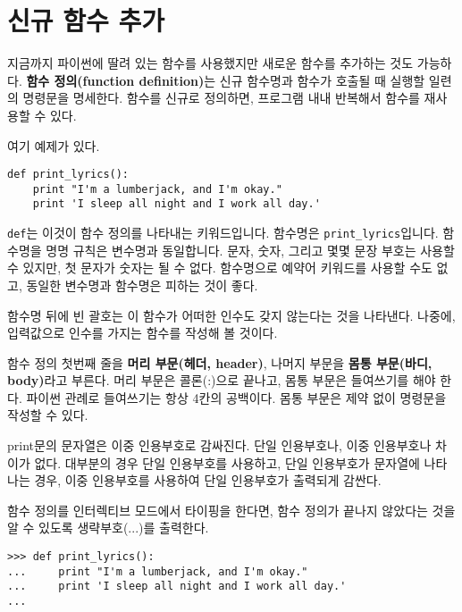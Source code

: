 \section{신규 함수 추가}

지금까지 파이썬에 딸려 있는 함수를 사용했지만 새로운 함수를 추가하는 것도 가능하다.
{\bf 함수 정의(function definition)}는 신규 함수명과 함수가 호출될 때 실행할 일련의 명령문을 명세한다.
함수를 신규로 정의하면, 프로그램 내내 반복해서 함수를 재사용할 수 있다. 


여기 예제가 있다.

\beforeverb
\begin{verbatim}
def print_lyrics():
    print "I'm a lumberjack, and I'm okay."
    print 'I sleep all night and I work all day.'
\end{verbatim}
\afterverb
%
{\tt def}는 이것이 함수 정의를 나타내는 키워드입니다. 함수명은 \verb"print_lyrics"입니다.
함수명을 명명 규칙은 변수명과 동일합니다. 문자, 숫자, 그리고 몇몇 문장 부호는 사용할 수 있지만,
첫 문자가 숫자는 될 수 없다. 함수명으로 예약어 키워드를 사용할 수도 없고, 동일한 변수명과 함수명은 피하는 것이 좋다.


함수명 뒤에 빈 괄호는 이 함수가 어떠한 인수도 갖지 않는다는 것을 나타낸다.
나중에, 입력값으로 인수를 가지는 함수를 작성해 볼 것이다.


함수 정의 첫번째 줄을 {\bf 머리 부문(헤더, header)}, 나머지 부문을 {\bf 몸통 부문(바디, body)}라고 부른다.
머리 부문은 콜론(:)으로 끝나고, 몸통 부문은 들여쓰기를 해야 한다.
파이썬 관례로 들여쓰기는 항상 4칸의 공백이다. 몸통 부문은 제약 없이 명령문을 작성할 수 있다.

print문의 문자열은 이중 인용부호로 감싸진다. 단일 인용부호나, 이중 인용부호나 차이가 없다.
대부분의 경우 단일 인용부호를 사용하고, 단일 인용부호가 문자열에 나타나는 경우, 이중 인용부호를 사용하여 단일 인용부호가 출력되게 감싼다.


함수 정의를 인터렉티브 모드에서 타이핑을 한다면, 함수 정의가 끝나지 않았다는 것을 알 수 있도록 생략부호(...)를 출력한다.

\beforeverb
\begin{verbatim}
>>> def print_lyrics():
...     print "I'm a lumberjack, and I'm okay."
...     print 'I sleep all night and I work all day.'
...
\end{verbatim}
\afterverb
%

